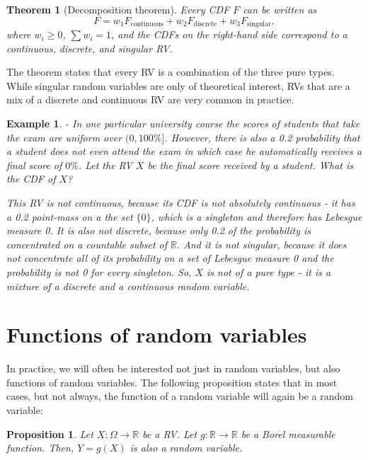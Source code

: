 \documentclass{book}
\theoremstyle{plain}%
\newtheorem{prototheorem}{Example}[section]
\newenvironment{cexample}
   {\colorlet{shadecolor}{gray!10}\begin{shaded}\begin{prototheorem}}
   {\end{prototheorem}\end{shaded}}
\newtheorem{theorem}{Theorem}[section]
\newtheorem{proposition}{Proposition}[section]
\theoremstyle{definition}
\newlength{\arrow}
\begin{document}
\begin{theorem}[Decomposition theorem]
Every CDF $F$ can be written as $$F = w_1 F_\text{continuous} + w_2 F_\text{discrete} + w_3 F_\text{singular},$$ where $w_i \geq 0$, $\sum w_i = 1$, and the CDFs on the right-hand side correspond to a continuous, discrete, and singular RV.
\end{theorem}

The theorem states that every RV is a combination of the three pure types. While singular random variables are only of theoretical interest, RVs that are a mix of a discrete and continuous RV are very common in practice.

\begin{cexample}{}{-} In one particular university course the scores of students that take the exam are uniform over $(0,100\%]$. However, there is also a 0.2 probability that a student does not even attend the exam in which case he automatically receives a final score of $0\%$. Let the RV $X$ be the final score received by a student. What is the CDF of $X$?

This RV is not continuous, because its CDF is not absolutely continuous - it has a 0.2 point-mass on a the set $\{0\}$, which is a singleton and therefore has Lebesgue measure 0. It is also not discrete, because only 0.2 of the probability is concentrated on a countable subset of $\mathbb{R}$. And it is not singular, because it does not concentrate all of its probability on a set of Lebesgue measure 0 and the probability is not 0 for every singleton. So, $X$ is not of a pure type - it is a mixture of a discrete and a continuous random variable.
\end{cexample}


\section{Functions of random variables}

In practice, we will often be interested not just in random variables, but also functions of random variables. The following proposition states that in most cases, but not always, the function of a random variable will again be a random variable:

\begin{proposition}
Let $X: \Omega \rightarrow \mathbb{R}$ be a RV. Let $g: \mathbb{R} \rightarrow \mathbb{R}$ be a Borel measurable function. Then, $Y = g(X)$ is also a random variable.
\end{proposition}
\end{document}
